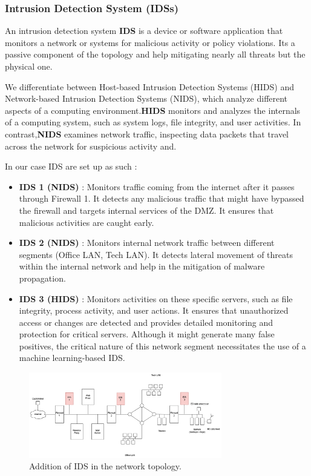 \documentclass[12pt]{article}
\begin{document}
\subsubsection*{Intrusion Detection System (IDSs)}
An intrusion detection system \textbf{IDS} is a device or software application that monitors a network or systems for malicious activity or policy violations. Its a passive component of the  topology and help mitigating nearly all threats but the physical one.

We differentiate between Host-based Intrusion Detection Systems (HIDS) and Network-based Intrusion Detection Systems (NIDS), which analyze different aspects of a computing environment.\textbf{HIDS} monitors and analyzes the internals of a computing system, such as system logs, file integrity, and user activities. In contrast,\textbf{NIDS} examines network traffic, inspecting data packets that travel across the network for suspicious activity and.

In our case IDS are set up as such : 
\begin{itemize}
    \item \textbf{IDS 1 (NIDS)} : Monitors traffic coming from the internet after it passes through Firewall 1. It detects any malicious traffic that might have bypassed the firewall and targets internal services of the DMZ. It ensures that malicious activities are caught early.
    \item \textbf{IDS 2 (NIDS)} : Monitors internal network traffic between different segments (Office LAN, Tech LAN). It detects lateral movement of threats within the internal network and help in the mitigation of malware propagation.
    \item \textbf{IDS 3 (HIDS)} : Monitors activities on these specific servers, such as file integrity, process activity, and user actions. It ensures that unauthorized access or changes are detected and provides detailed monitoring and protection for critical servers. Although it might generate many false positives, the critical nature of this network segment necessitates the use of a machine learning-based IDS.
\end{itemize}

\begin{figure}[h]
    \centering
    \includegraphics[width=0.75\textwidth]{Figures/Solutions/network_topo_ids.png}
    \caption{Addition of IDS in the network topology.}
\end{figure}
\end{document}
